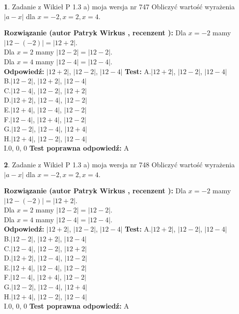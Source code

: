 \documentclass[12pt, a4paper]{article}
\theoremstyle{definition} %
\newtheorem{zad}{}
\newcommand{\zadStart}[1]{\begin{zad}#1\newline}
\newcommand{\zadStop}{\end{zad}}
\newcommand{\rozwStart}[2]{\noindent \textbf{Rozwiązanie (autor #1 , recenzent #2): }\newline}
\newcommand{\rozwStop}{\newline}
\newcommand{\odpStart}{\noindent \textbf{Odpowiedź:}\newline}
\newcommand{\odpStop}{\newline}
\newcommand{\testStart}{\noindent \textbf{Test:}\newline}
\newcommand{\testStop}{\newline}
\newcommand{\kluczStart}{\noindent \textbf{Test poprawna odpowiedź:}\newline}
\newcommand{\kluczStop}{\newline}
\begin{document}
\zadStart{Zadanie z Wikieł P 1.3 a) moja wersja nr 747}
Obliczyć wartość wyrażenia $|a - x|$ dla $x=-2,x=2,x=4$.
\zadStop
\rozwStart{Patryk Wirkus}{}
Dla $x = -2$ mamy $|12 - (-2)| = |12 + 2|$.\\
Dla $x = 2$ mamy $|12 - 2| = |12 - 2|$.\\
Dla $x = 4$ mamy $|12 - 4| = |12 - 4|$.\\
\rozwStop
\odpStart
$|12 + 2|$, $|12 - 2|$, $|12 - 4|$
\odpStop
\testStart
A.$|12 + 2|$, $|12 - 2|$, $|12 - 4|$\\
B.$|12 - 2|$, $|12 + 2|$, $|12 - 4|$\\
C.$|12 - 4|$, $|12 - 2|$, $|12 + 2|$\\
D.$|12 + 2|$, $|12 - 4|$, $|12 - 2|$\\
E.$|12 + 4|$, $|12 - 4|$, $|12 - 2|$\\
F.$|12 - 4|$, $|12 + 4|$, $|12 - 2|$\\
G.$|12 - 2|$, $|12 - 4|$, $|12 + 4|$\\
H.$|12 + 4|$, $|12 - 2|$, $|12 - 4|$\\
I.$0$, $0$, $0$
\testStop
\kluczStart
A
\kluczStop



\zadStart{Zadanie z Wikieł P 1.3 a) moja wersja nr 748}
Obliczyć wartość wyrażenia $|a - x|$ dla $x=-2,x=2,x=4$.
\zadStop
\rozwStart{Patryk Wirkus}{}
Dla $x = -2$ mamy $|12 - (-2)| = |12 + 2|$.\\
Dla $x = 2$ mamy $|12 - 2| = |12 - 2|$.\\
Dla $x = 4$ mamy $|12 - 4| = |12 - 4|$.\\
\rozwStop
\odpStart
$|12 + 2|$, $|12 - 2|$, $|12 - 4|$
\odpStop
\testStart
A.$|12 + 2|$, $|12 - 2|$, $|12 - 4|$\\
B.$|12 - 2|$, $|12 + 2|$, $|12 - 4|$\\
C.$|12 - 4|$, $|12 - 2|$, $|12 + 2|$\\
D.$|12 + 2|$, $|12 - 4|$, $|12 - 2|$\\
E.$|12 + 4|$, $|12 - 4|$, $|12 - 2|$\\
F.$|12 - 4|$, $|12 + 4|$, $|12 - 2|$\\
G.$|12 - 2|$, $|12 - 4|$, $|12 + 4|$\\
H.$|12 + 4|$, $|12 - 2|$, $|12 - 4|$\\
I.$0$, $0$, $0$
\testStop
\kluczStart
A
\kluczStop
\end{document}
